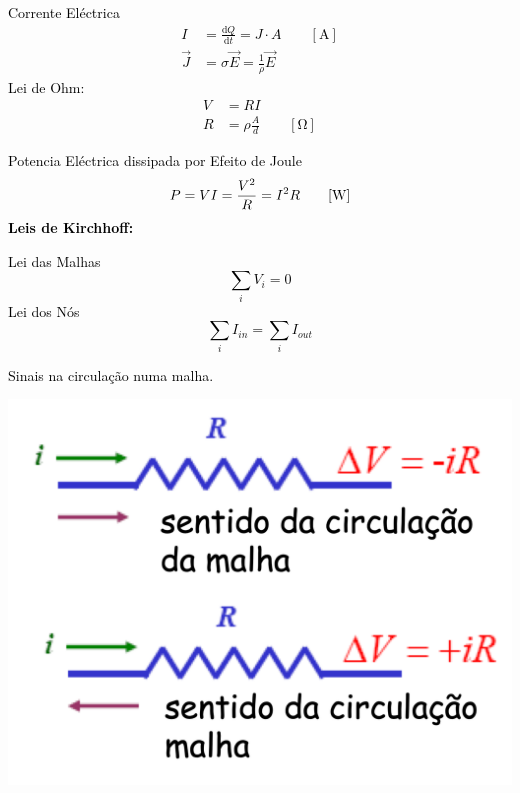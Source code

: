 \documentclass[a4paper,10pt]{extarticle} %
\newcommand{\mybox}[2]{
    \begin{tcolorbox}[colback=lightblue!5!white,colframe=lightblue!75!black,boxsep=1pt,arc=0pt,outer arc=0pt,title={\textcolor{black}{#1}}]
        \textcolor{black}{#2}
    \end{tcolorbox}
}
\begin{document}
\begin{multicols}{2}
\mybox{Corrente Eléctrica e resistência} {
\begin{multicols}{2}
        Corrente Eléctrica
        \begin{align}
            I &= \frac{\mathrm{d} Q}{\mathrm{d} t}  = J \cdot A\qquad [\mathrm{A}]\\
            \vec{J} &= \sigma \vec{E} = \frac{1}{\rho} \vec{E}
        \end{align}
        Lei de Ohm:
        \begin{align}
            V &= R I \\
            R &= \rho \frac{A}{d}  \qquad [\mathrm{\Omega}]
        \end{align}
        \end{multicols}
        Potencia Eléctrica dissipada por Efeito de Joule
        \begin{equation}
            P = V I = \frac{V^2}{R} = I^2 R\qquad [\mathrm{W}]\\
         \end{equation}
         {\bf Leis de Kirchhoff:}
\begin{multicols}{2}
    Lei das Malhas
        \begin{equation}
            \sum\limits_i V_i = 0
        \end{equation}
    Lei dos Nós
        \begin{equation}
            \sum\limits_i I_{in} = \sum\limits_i I_{out}
        \end{equation}
\end{multicols}
Sinais na circulação numa malha.
\begin{multicols}{2}
    \begin{center}
      \includegraphics[width=0.8\columnwidth]{Kirk_R.png}

\end{center}
\end{multicols}}
\end{multicols}
\end{document}
